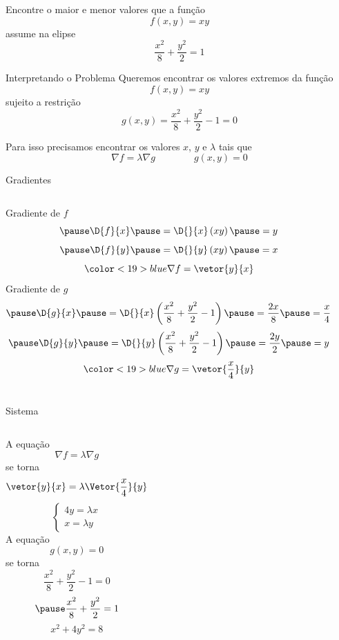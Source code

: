 \begin{question}
  Encontre o maior e menor valores que a função
  \[
    f(x, y) = xy
  \]
  assume na elipse
  \[
    \frac{x^2}{8} + \frac{y^2}{2} = 1
  \]
\end{question}

\begin{resolution}{Interpretando o Problema}
  Queremos encontrar os valores extremos da função
  \[
    f(x, y) = xy
  \]
  \pause
  sujeito a restrição
  \[
    g(x, y) = \frac{x^2}{8} + \frac{y^2}{2} - 1 = 0
  \]

  \pause
  Para isso precisamos encontrar os valores $x$, $y$ e $\lambda$ tais que
  \[
    \nabla f = \lambda \nabla g
    \qquad\qquad
    g(x, y) = 0
  \]
\end{resolution}

\begin{resolution}{Gradientes}
\begin{columns}
  Gradiente de $f$
  \[
    \pause
    \D{f}{x}
    \pause
    = \D{}{x}\left(xy\right)
    \pause
    = y
  \]
  \[
    \pause
    \D{f}{y}
    \pause
    = \D{}{y}\left(xy\right)
    \pause
    = x
  \]
  \pause
  \[
    {\color<19>{blue}\nabla f = \vetor{y}{x}}
  \]
  \pause
  Gradiente de $g$
  \[
    \pause
    \D{g}{x}
    \pause
    = \D{}{x}\left(\frac{x^2}{8} + \frac{y^2}{2} - 1\right)
    \pause
    = \frac{2x}{8}
    \pause
    = \frac{x}{4}
  \]
  \[
    \pause
    \D{g}{y}
    \pause
    = \D{}{y}\left(\frac{x^2}{8} + \frac{y^2}{2} - 1 \right)
    \pause
    = \frac{2y}{2}
    \pause
    = y
  \]
  \pause
  \[
    {\color<19>{blue}\nabla g = \vetor{\dfrac{x}{4}}{y}}
  \]
\end{columns}
\end{resolution}

\begin{resolution}{Sistema}
\begin{columns}[t]
  A equação
  \[
    \nabla f = \lambda \nabla g
  \]
  \pause
  se torna
  \[
    \vetor{y}{x} = \lambda \Vetor{\dfrac{x}{4}}{y}
  \]
  {%
  \pause
  \[
    \begin{cases}
      4y = \lambda x \\[2mm]
      x = \lambda y
    \end{cases}
  \]}
  \pause
  A equação
  \[
    g(x, y) = 0
  \]
  \pause
  se torna
  \[
    \frac{x^2}{8} + \frac{y^2}{2} - 1 = 0
  \]
  \[
    \pause
    \frac{x^2}{8} + \frac{y^2}{2} = 1
  \]
  {%
  \pause
  \[
    x^2 + 4y^2 = 8
  \]}
\end{columns}
\end{resolution}

